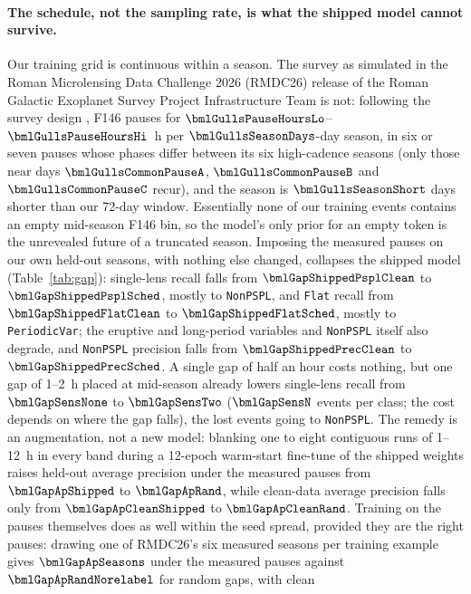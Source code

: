 \paragraph{The schedule, not the sampling rate, is what the shipped model cannot survive.}
Our training grid is continuous within a season. The survey as simulated in the Roman Microlensing Data Challenge 2026 (RMDC26) release of
the Roman Galactic Exoplanet Survey Project Infrastructure Team \citep{RGESPIT2026} is not: following the
survey design \citep{STScI2025GBTDS,ROTAC2025}, F146 pauses for $\bmlGullsPauseHoursLo$--$\bmlGullsPauseHoursHi$~h
per $\bmlGullsSeasonDays$-day season, in six or seven pauses whose phases differ between its six
high-cadence seasons (only those near days $\bmlGullsCommonPauseA$, $\bmlGullsCommonPauseB$ and
$\bmlGullsCommonPauseC$ recur), and the season is $\bmlGullsSeasonShort$ days shorter than our 72-day
window. Essentially none of our training events contains an empty mid-season F146 bin, so the model's
only prior for an empty token is the unrevealed future of a truncated season. Imposing the measured
pauses on our own held-out seasons, with nothing else changed, collapses the shipped model
(Table~\ref{tab:gap}): single-lens recall falls from $\bmlGapShippedPsplClean$ to
$\bmlGapShippedPsplSched$, mostly to \texttt{NonPSPL}, and \texttt{Flat} recall from
$\bmlGapShippedFlatClean$ to $\bmlGapShippedFlatSched$, mostly to \texttt{PeriodicVar}; the eruptive
and long-period variables and \texttt{NonPSPL} itself also degrade, and \texttt{NonPSPL} precision
falls from $\bmlGapShippedPrecClean$ to $\bmlGapShippedPrecSched$. A single gap of half an hour costs
nothing, but one gap of 1--2~h placed at mid-season already lowers single-lens recall from $\bmlGapSensNone$ to
$\bmlGapSensTwo$ ($\bmlGapSensN$ events per class; the cost depends on where the gap falls), the lost events going to \texttt{NonPSPL}. The remedy is an augmentation, not a new model:
blanking one to eight contiguous runs of 1--12~h in every band during a 12-epoch warm-start fine-tune of
the shipped weights raises held-out average precision under the measured pauses from
$\bmlGapApShipped$ to $\bmlGapApRand$, while clean-data average precision falls only from
$\bmlGapApCleanShipped$ to $\bmlGapApCleanRand$. Training on the pauses themselves does as well within the seed spread,
provided they are the right pauses: drawing one of RMDC26's six measured seasons per training example gives
$\bmlGapApSeasons$ under the measured pauses against $\bmlGapApRandNorelabel$ for random gaps, with clean
